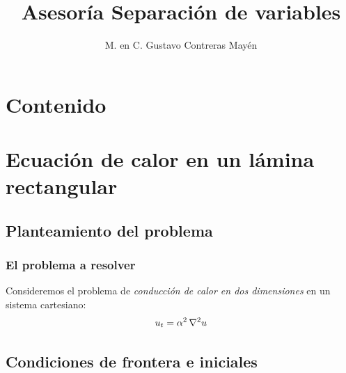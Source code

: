 \documentclass[12pt]{beamer}
\title{\large{Asesoría Separación de variables}}
\author{M. en C. Gustavo Contreras Mayén}
\date{}
\begin{document}
\maketitle
\fontsize{14}{14}\selectfont
{}
\section*{Contenido}

\section{Ecuación de calor en un lámina rectangular}
\subsection{Planteamiento del problema}

\begin{frame}
\frametitle{El problema a resolver}
Consideremos el problema de \emph{conducción de calor en dos dimensiones} en un sistema cartesiano:
\begin{align}
u_{t} = \alpha^{2} \, \laplacian{u}
\label{eq:ecuacion_02_187}
\end{align}
\end{frame}

\subsection{Condiciones de frontera e iniciales}
\end{document}
